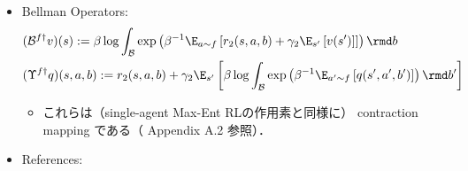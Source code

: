 \documentclass[a4paper,10pt,dvipdfmx]{jsarticle}
\begin{document}
\begin{itemize}
\begin{itemize}
        \begin{align}
            &g_f^*(b|s)=\dfrac{\exp\left(\beta^{-1}\E_{a\sim f}\left[Q_2^{f\dag}(s,a,b)\right]\right)}{Z^{f\dag}(s)},\\
        \where &Z^{f\dag}(s):=\int_{\mathcal{B}}\exp\left(\beta^{-1}\E_{a\sim f}\left[Q_2^{f\dag}(s,a,b)\right]\right)\rmd b.
        \end{align}
        \item このとき，Bellman expectation equation より，
        \begin{align}
            Q_2^{f\dag}(s,a,b)&=r_2(s,a,b)+\gamma_2\E_{s'}\E_{a\sim f,b\sim g_f^*}\left[Q_2^{f\dag}(s',a',b')+\beta\mathcal{H}^{g_f^*}(s')\right]\\
            &=r_2(s,a,b)+\gamma_2\E_{s'}\left[\beta\log Z^{f\dag}(s')\right]\\
            &\implies V_2^{f\dag}(s)=\beta\log Z^{f\dag}(s)\\
            &\therefore V_2^{f\dag}(s)=\beta\log\int_{\mathcal{B}}\exp\left(\beta^{-1}\E_{a\sim f}\left[Q_2^{f\dag}(s,a,b)\right]\right)\rmd b
        \end{align}
        \item 以上をまとめると，以下が成り立つ：
        \begin{align}
            &V_2^{f\dag}(s)=\beta\log\int_{\mathcal{B}}\exp\left(\beta^{-1}\E_{a\sim f}\left[Q_2^{f\dag}(s,a,b)\right]\right)\rmd b\\
            &Q_2^{f\dag}(s,a,b)=r_2(s,a,b)+\gamma_2\E_{s'}\left[V_2^{f\dag}(s')\right]\\
            &g_f^*(b|s)=\exp\left(\beta^{-1}\left(\E_{a\sim f}\left[Q_2^{f\dag}(s,a,b)\right]-V_2^{f\dag}(s)\right)\right)
        \end{align}
    \end{itemize}
    \item Bellman Operators:
    \begin{align}
        &(\mathcal{B}^{f\dag}v)(s):=\beta\log\int_{\mathcal{B}}\exp\left(\beta^{-1}\E_{a\sim f}\left[r_2(s,a,b)+\gamma_2\E_{s'}\left[v(s')\right]\right]\right)\rmd b\\
        &(\Upsilon^{f\dag}q)(s,a,b):=r_2(s,a,b)+\gamma_2\E_{s'}\left[\beta\log\int_{\mathcal{B}}\exp\left(\beta^{-1}\E_{a'\sim f}\left[q(s',a',b')\right]\right)\rmd b'\right]
    \end{align}
    \begin{itemize}
        \item これらは（single-agent Max-Ent RLの作用素と同様に） contraction mapping である（\cite{Haarnoja2017-nn} Appendix A.2 参照）．
    \end{itemize}
    \item References:\cite{Haarnoja2017-nn,Nakaguchi2022-ds}
\end{itemize}
\end{document}
